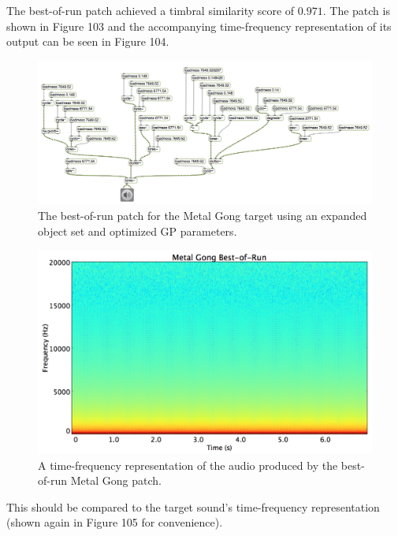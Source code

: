 \documentclass[12pt]{report} 	%
\numberwithin{figure}{chapter}
\numberwithin{table}{chapter}
\numberwithin{equation}{chapter}
\begin{document}
\begin{flushleft}
The best-of-run patch achieved a timbral similarity score of $0.971$. The patch is shown in Figure 103 and the accompanying time-frequency representation of its output can be seen in Figure 104.
\begin{figure}[h!]
\begin{center}
\includegraphics[angle=270, scale=0.45]{MetalGong_Best}
\caption[Metal gong best-of-run patch]{The best-of-run patch for the Metal Gong target using an expanded object set and optimized GP parameters.}
\end{center}
\end{figure}
\begin{figure}[h!]
\begin{center}
\includegraphics[scale=0.35,width=\linewidth]{MetalGongBestOfRunSTFT}
\caption[Best-of-run metal gong time-frequency representation]{A time-frequency representation of the audio produced by the best-of-run Metal Gong patch.}
\end{center}
\end{figure}
This should be compared to the target sound's time-frequency representation (shown again in Figure 105 for convenience).
\begin{figure}[h!]
\begin{center}

\end{center}
\end{figure}
\end{flushleft}
\end{document}
